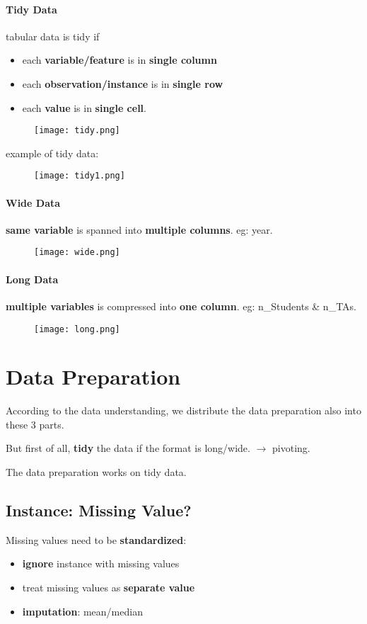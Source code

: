 \paragraph{Tidy Data} tabular data is tidy if
\begin{itemize}
	\item each \textbf{variable/feature} is in \textbf{single column}
	\item each \textbf{observation/instance} is in \textbf{single row}
	\item each \textbf{value} is in \textbf{single cell}.
\end{itemize}
\begin{figure}[H]
	\centering
	\texttt{[image: tidy.png]}
\end{figure}
example of tidy data:
\begin{figure}[H]
	\centering
	\texttt{[image: tidy1.png]}
\end{figure}
\paragraph{Wide Data} \textbf{same variable} is spanned into \textbf{multiple columns}. eg: year.
\begin{figure}[H]
	\centering
	\texttt{[image: wide.png]}
\end{figure}
\paragraph{Long Data} \textbf{multiple variables} is compressed into \textbf{one column}. eg: n\_Students \& n\_TAs.
\begin{figure}[H]
	\centering
	\texttt{[image: long.png]}
\end{figure}

\section{Data Preparation}
According to the data understanding, we distribute the data preparation also into these 3 parts.

But first of all, \textbf{tidy} the data if the format is long/wide. $\rightarrow$ pivoting.

The data preparation works on tidy data.
\subsection{Instance: Missing Value?}
Missing values need to be \textbf{standardized}:
\begin{itemize}
	\item \textbf{ignore} instance with missing values
	\item treat missing values as \textbf{separate value}
	\item \textbf{imputation}: mean/median
\end{itemize}
